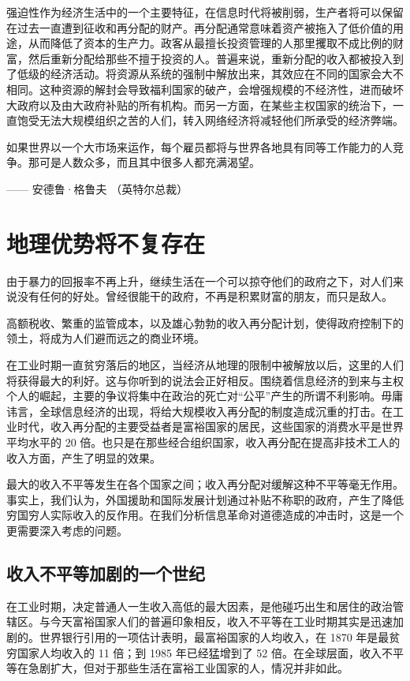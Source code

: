 强迫性作为经济生活中的一个主要特征，在信息时代将被削弱，生产者将可以保留在过去一直遭到征收和再分配的财产。再分配通常意味着资产被拖入了低价值的用途，从而降低了资本的生产力。政客从最擅长投资管理的人那里攫取不成比例的财富，然后重新分配给那些不擅于投资的人。普遍来说，重新分配的收入都被投入到了低级的经济活动。将资源从系统的强制中解放出来，其效应在不同的国家会大不相同。这种资源的解封会导致福利国家的破产，会增强规模的不经济性，进而破坏大政府以及由大政府补贴的所有机构。而另一方面，在某些主权国家的统治下，一直饱受无法大规模组织之苦的人们，转入网络经济将减轻他们所承受的经济弊端。

\begin{tcolorbox}
\kaishu 如果世界以一个大市场来运作，每个雇员都将与世界各地具有同等工作能力的人竞争。那可是人数众多，而且其中很多人都充满渴望。
\begin{flushright}
—— 安德鲁·格鲁夫 （英特尔总裁）
\end{flushright}
\end{tcolorbox}


\section{地理优势将不复存在}
由于暴力的回报率不再上升，继续生活在一个可以掠夺他们的政府之下，对人们来说没有任何的好处。曾经很能干的政府，不再是积累财富的朋友，而只是敌人。

高额税收、繁重的监管成本，以及雄心勃勃的收入再分配计划，使得政府控制下的领土，将成为人们避而远之的商业环境。

在工业时期一直贫穷落后的地区，当经济从地理的限制中被解放以后，这里的人们将获得最大的利好。这与你听到的说法会正好相反。围绕着信息经济的到来与主权个人的崛起，主要的争议将集中在政治的死亡对“公平”产生的所谓不利影响。毋庸讳言，全球信息经济的出现，将给大规模收入再分配的制度造成沉重的打击。在工业时代，收入再分配的主要受益者是富裕国家的居民，这些国家的消费水平是世界平均水平的 20 倍。也只是在那些经合组织国家，收入再分配在提高非技术工人的收入方面，产生了明显的效果。

最大的收入不平等发生在各个国家之间；收入再分配对缓解这种不平等毫无作用。事实上，我们认为，外国援助和国际发展计划通过补贴不称职的政府，产生了降低穷国穷人实际收入的反作用。在我们分析信息革命对道德造成的冲击时，这是一个更需要深入考虑的问题。

\subsection{收入不平等加剧的一个世纪}
在工业时期，决定普通人一生收入高低的最大因素，是他碰巧出生和居住的政治管辖区。与今天富裕国家人们的普遍印象相反，收入不平等在工业时期其实是迅速加剧的。世界银行引用的一项估计表明，最富裕国家的人均收入，在 1870 年是最贫穷国家人均收入的 11 倍；到 1985 年已经猛增到了 52 倍。在全球层面，收入不平等在急剧扩大，但对于那些生活在富裕工业国家的人，情况并非如此。

